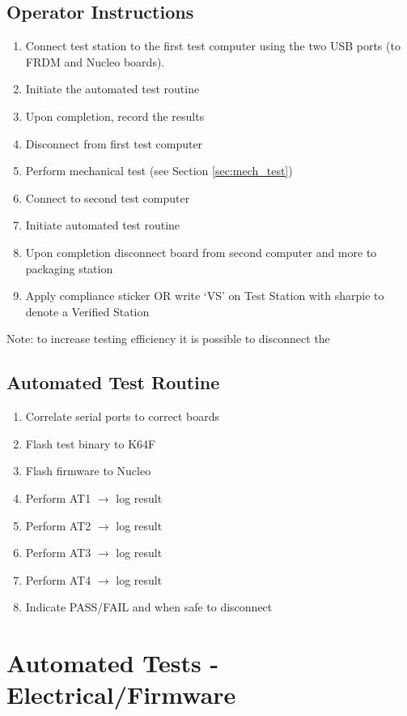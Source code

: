 \documentclass[]{article}
\begin{document}
\subsection{Operator Instructions}
\begin{enumerate}
	\item Connect test station to the first test computer using the two USB ports (to FRDM and Nucleo boards). 
	\item Initiate the automated test routine
	\item Upon completion, record the results
	\item Disconnect from first test computer
	\item Perform mechanical test (see Section \ref{sec:mech_test})
	\item Connect to second test computer
	\item Initiate automated test routine
	\item Upon completion disconnect board from second computer and more to packaging station
	\item Apply compliance sticker OR write `VS' on Test Station with sharpie to denote a Verified Station
\end{enumerate}

Note: to increase testing efficiency it is possible to disconnect the 

\subsection{Automated Test Routine}

\begin{enumerate}
	\item Correlate serial ports to correct boards
	\item Flash test binary to K64F
	\item Flash firmware to Nucleo
	\item Perform AT1 $\rightarrow$ log result
	\item Perform AT2 $\rightarrow$ log result
	\item Perform AT3 $\rightarrow$ log result
	\item Perform AT4 $\rightarrow$ log result
	\item Indicate PASS/FAIL and when safe to disconnect
	
\end{enumerate}

\section{Automated Tests - Electrical/Firmware}
\end{document}
